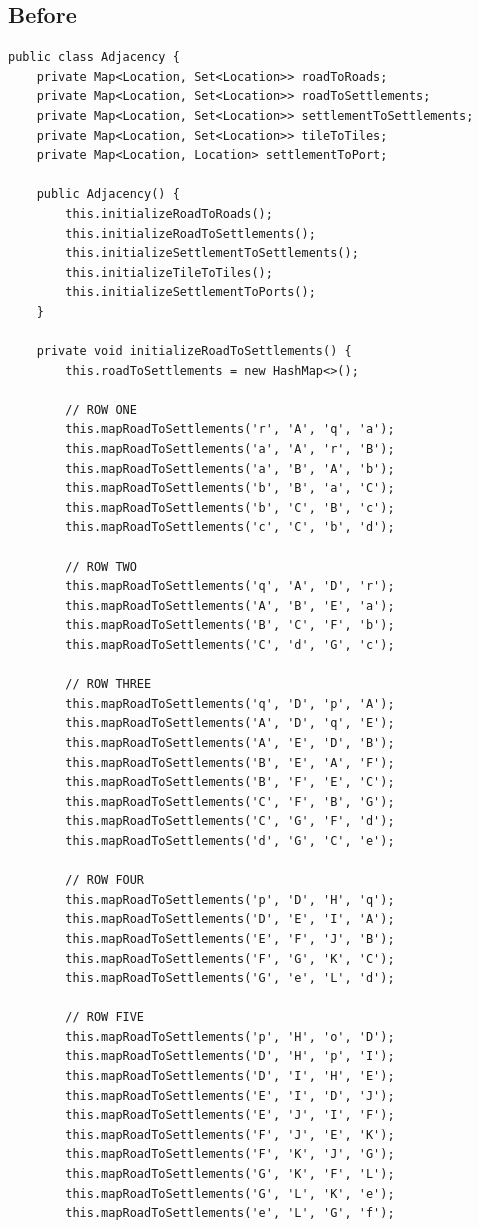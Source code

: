 \documentclass{fank1basedocument}
\begin{document}
\subsection*{Before}
\begin{lstlisting}[style=javacode,language=myJava]
public class Adjacency {
	private Map<Location, Set<Location>> roadToRoads;
	private Map<Location, Set<Location>> roadToSettlements;
	private Map<Location, Set<Location>> settlementToSettlements;
	private Map<Location, Set<Location>> tileToTiles;
	private Map<Location, Location> settlementToPort;

	public Adjacency() {
		this.initializeRoadToRoads();
		this.initializeRoadToSettlements();
		this.initializeSettlementToSettlements();
		this.initializeTileToTiles();
		this.initializeSettlementToPorts();
	}
		
	private void initializeRoadToSettlements() {
		this.roadToSettlements = new HashMap<>();

		// ROW ONE
		this.mapRoadToSettlements('r', 'A', 'q', 'a');
		this.mapRoadToSettlements('a', 'A', 'r', 'B');
		this.mapRoadToSettlements('a', 'B', 'A', 'b');
		this.mapRoadToSettlements('b', 'B', 'a', 'C');
		this.mapRoadToSettlements('b', 'C', 'B', 'c');
		this.mapRoadToSettlements('c', 'C', 'b', 'd');

		// ROW TWO
		this.mapRoadToSettlements('q', 'A', 'D', 'r');
		this.mapRoadToSettlements('A', 'B', 'E', 'a');
		this.mapRoadToSettlements('B', 'C', 'F', 'b');
		this.mapRoadToSettlements('C', 'd', 'G', 'c');

		// ROW THREE
		this.mapRoadToSettlements('q', 'D', 'p', 'A');
		this.mapRoadToSettlements('A', 'D', 'q', 'E');
		this.mapRoadToSettlements('A', 'E', 'D', 'B');
		this.mapRoadToSettlements('B', 'E', 'A', 'F');
		this.mapRoadToSettlements('B', 'F', 'E', 'C');
		this.mapRoadToSettlements('C', 'F', 'B', 'G');
		this.mapRoadToSettlements('C', 'G', 'F', 'd');
		this.mapRoadToSettlements('d', 'G', 'C', 'e');

		// ROW FOUR
		this.mapRoadToSettlements('p', 'D', 'H', 'q');
		this.mapRoadToSettlements('D', 'E', 'I', 'A');
		this.mapRoadToSettlements('E', 'F', 'J', 'B');
		this.mapRoadToSettlements('F', 'G', 'K', 'C');
		this.mapRoadToSettlements('G', 'e', 'L', 'd');

		// ROW FIVE
		this.mapRoadToSettlements('p', 'H', 'o', 'D');
		this.mapRoadToSettlements('D', 'H', 'p', 'I');
		this.mapRoadToSettlements('D', 'I', 'H', 'E');
		this.mapRoadToSettlements('E', 'I', 'D', 'J');
		this.mapRoadToSettlements('E', 'J', 'I', 'F');
		this.mapRoadToSettlements('F', 'J', 'E', 'K');
		this.mapRoadToSettlements('F', 'K', 'J', 'G');
		this.mapRoadToSettlements('G', 'K', 'F', 'L');
		this.mapRoadToSettlements('G', 'L', 'K', 'e');
		this.mapRoadToSettlements('e', 'L', 'G', 'f');


\end{lstlisting}
\end{document}
